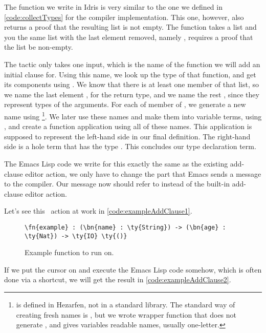The  function we write in Idris is very similar to the one we
defined in \autoref{code:collectTypes} for the compiler implementation.
This one, however, also returns a proof that the resulting list is not empty.
The function takes a list and you the same list with the last element removed,
namely , requires a proof that the list be non-empty.

The  tactic only takes one input, which is the name of the function
we will add an initial clause for.
Using this name, we look up the type of that function, and get its components
using . We know that there is at least one member of that
list, so we name the last element , for the return type, and we name
the rest , since they represent types of the arguments.
For each of member of , we generate a new name using
\footnote{ is defined in Hezarfen, not in a standard
library. The standard way of creating fresh names is , but we wrote
wrapper function  that does not generate , and gives variables
readable names, usually one-letter.}. We later use these names and make them
into variable terms, using , and create a function application using
all of these names. This application is supposed to represent the left-hand
side in our final definition. The right-hand side is a hole term that has the
type .  This concludes our type declaration term.

The Emacs Lisp code we write for this exactly the same as the existing
add-clause editor action, we only have to change the part that Emacs sends a
message to the compiler. Our message now should refer to  instead
of the built-in add-clause editor action.

Let's see this \Elab\ action at work in \autoref{code:exampleAddClause1}.

\begin{figure}[ht]
\caption{Example function to run  on.}
\label{code:exampleAddClause1}
\begin{Verbatim}[framesep=2mm, label=\footnotesize{\normalfont{Idris}}, labelposition=topline]
\fn{example} : (\bn{name} : \ty{String}) -> (\bn{age} : \ty{Nat}) -> \ty{IO} \ty{()}
\end{Verbatim}
\end{figure}

If we put the cursor on  and execute the Emacs Lisp code somehow, which is often done via a shortcut, we will get the result in \autoref{code:exampleAddClause2}.

